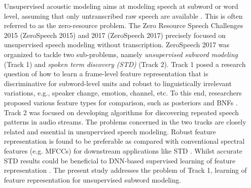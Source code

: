 \documentclass[a4paper]{article}
\begin{document}
Unsupervised acoustic modeling aims at modeling speech at subword or word level, assuming that only untranscribed raw speech are available \cite{glass2012towards,kamper2015fully,thiolliere2015hybrid,feng2016exploit}. This is often referred to as the zero-resource problem. The Zero Resource Speech Challenges 2015 (ZeroSpeech 2015) \cite{versteegh2015zero} and 2017 (ZeroSpeech 2017) \cite{dunbar2017zero} precisely focused on unsupervised speech modeling without transcription. ZeroSpeech 2017 was organized to tackle two sub-problems, namely \textit{unsupervised subword modeling} (Track 1) and \textit{spoken term discovery (STD)} (Track 2). Track 1 posed a research question of how to learn a frame-level feature representation that is discriminative for subword-level units and robust to linguistically irrelevant variations, e.g., speaker change, emotion, channel, etc. 
To this end, researchers proposed various feature types for comparison, such as posteriors \cite{heck2017feature,ansari2017unsupervised,shibata2017composite} and BNFs \cite{chen2017multilingual,yuan2017extracting,shibata2017composite}. 
Track 2 was focused on developing algorithms for discovering repeated speech patterns in audio streams. The problems concerned in the two tracks are  closely related and essential in unsupervised speech modeling. Robust feature representation is found to be preferable as compared with conventional spectral features (e.g. MFCCs) for downstream applications like STD \cite{Chen+2016}. Whilst accurate STD results could be beneficial to DNN-based supervised learning of feature representation \cite{thiolliere2015hybrid,chung2015iterative,yuan2017extracting}. The present study addresses the problem of Track 1, learning of feature representation for unsupervised subword modeling.
\end{document}
